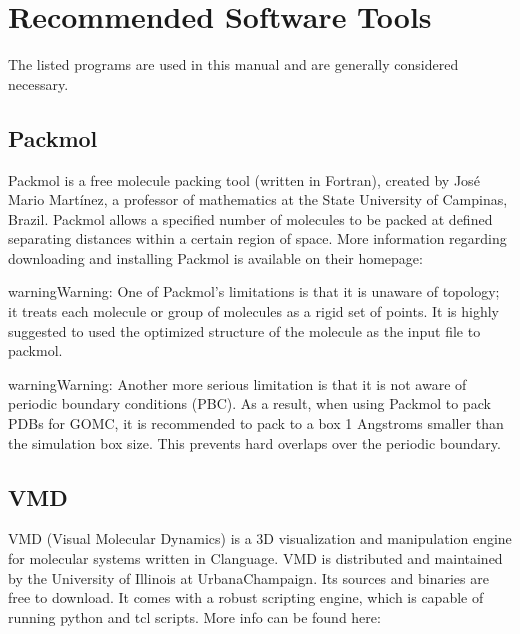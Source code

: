 \documentclass[letterpaper,10pt,english]{sphinxmanual}
\begin{document}
\chapter{Recommended Software Tools}
\label{\detokenize{software_tools:recommended-software-tools}}\label{\detokenize{software_tools::doc}}
The listed programs are used in this manual and are generally considered necessary.


\section{Packmol}
\label{\detokenize{software_tools:packmol}}
Packmol is a free molecule packing tool (written in Fortran), created by José Mario Martínez, a professor of mathematics at the State University of Campinas, Brazil. Packmol allows a specified number of molecules to be packed at defined separating distances within a certain region of space. More information regarding downloading and installing Packmol is available on their homepage:


\begin{sphinxadmonition}{warning}{Warning:}
One of Packmol’s limitations is that it is unaware of topology; it treats each molecule or group of molecules as a rigid set of points. It is highly suggested to used the optimized structure of the molecule as the input file to packmol.
\end{sphinxadmonition}

\begin{sphinxadmonition}{warning}{Warning:}
Another more serious limitation is that it is not aware of periodic boundary conditions (PBC). As a result, when using Packmol to pack PDBs for GOMC, it is recommended to pack to a box 1 Angstroms smaller than the simulation box size. This prevents hard overlaps over the periodic boundary.
\end{sphinxadmonition}


\section{VMD}
\label{\detokenize{software_tools:vmd}}
VMD (Visual Molecular Dynamics) is a 3\sphinxhyphen{}D visualization and manipulation engine for molecular systems written in C\sphinxhyphen{}language. VMD is distributed and maintained by the University of Illinois at Urbana\sphinxhyphen{}Champaign. Its sources and binaries are free to download. It comes with a robust scripting engine, which is capable of running python and tcl scripts. More info can be found here:
\end{document}
